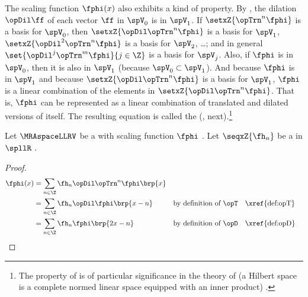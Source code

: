 The scaling function $\fphi(x)$  also exhibits a kind of  property.
By , the dilation $\opDil\ff$ of each vector $\ff$ in $\spV_0$ is in $\spV_1$.
If $\setxZ{\opTrn^n\fphi}$ is a basis for $\spV_0$,
then $\setxZ{\opDil\opTrn^n\fphi}$ is a basis for $\spV_1$,
$\setxZ{\opDil^2\opTrn^n\fphi}$ is a basis for $\spV_2$, \ldots;
and in general $\set{\opDil^j\opTrn^m\fphi}{j\in\Z}$ is a basis for $\spV_j$.
Also, if $\fphi$ is in $\spV_0$, then it is also in $\spV_1$ (because $\spV_0\subset\spV_1$).
And because $\fphi$ is in $\spV_1$ and because $\setxZ{\opDil\opTrn^n\fphi}$ is a basis for $\spV_1$,
$\fphi$ is a linear combination of the elements in $\setxZ{\opDil\opTrn^n\fphi}$.
That is, $\fphi$ can be represented as a linear combination of translated and dilated versions of itself.
The resulting equation is called the  (, next).\footnote{%
The property of  is of particular significance in the theory of 
 (a Hilbert space is a complete normed linear space equipped with an inner product)%
.
}

\begin{definition}
\label{def:dilation_eq}
Let $\MRAspaceLLRV$ be a  with scaling function $\fphi$ .
Let $\seqxZ{\fh_n}$ be a   in $\spllR$ .
\end{definition}

\begin{remark}
\end{remark}
\begin{proof}
  \begin{align*}
    \fphi(x)
      &= \sum_{n\in\Z} \fh_n \opDil \opTrn^n \fphi\brp{x}
    \\&= \sum_{n\in\Z} \fh_n \opDil \fphi\brp{x-n}
      && \text{by definition of $\opT$} && \text{\xref{def:opT}}
    \\&= \sum_{n\in\Z} \fh_n \fphi\brp{2x-n}
      && \text{by definition of $\opD$} && \text{\xref{def:opD}}
  \end{align*}
\end{proof}

